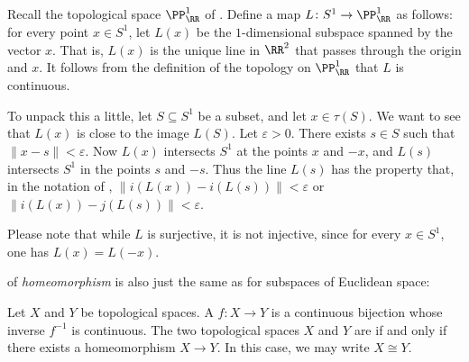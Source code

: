 \begin{exm}
	Recall the topological space $\PP^1_{\RR}$ of .
	Define a map $ L \colon S^1 \to \PP^1_{\RR}$ as follows: for every point $x \in S^1$, let $L(x)$ be the $1$-dimensional subspace spanned by the vector $x$.
	That is, $L(x)$ is the unique line in $\RR^2$ that passes through the origin and $x$.
	It follows from the definition of the topology on $\PP^1_{\RR}$ that $L$ is continuous.

	To unpack this a little, let $S \subseteq S^1$ be a subset, and let $x \in \tau(S)$.
	We want to see that $L(x)$ is close to the image $L(S)$.
	Let $\varepsilon>0$.
	There exists $ s \in S$ such that $\|x-s\| < \varepsilon$.
	Now $L(x)$ intersects $S^1$ at the points $x$ and $-x$, and $L(s)$ intersects $S^1$ in the points $s$ and $-s$.
	Thus the line $L(s)$ has the property that, in the notation of , $\|i(L(x))-i(L(s))\| < \varepsilon$ or $\|i(L(x))-j(L(s))\| < \varepsilon$.

	Please note that while $L$ is surjective, it is not injective, since for every $x \in S^1$, one has $L(x) = L(-x)$.
\end{exm}

 of \emph{homeomorphism} is also just the same as for subspaces of Euclidean space:

\begin{dfn}
	Let $X$ and $Y$ be topological spaces.
	A  $f \colon X \to Y $ is a continuous bijection whose inverse $f^{-1}$ is continuous.
	The two topological spaces $X$ and $Y$ are  if and only if there exists a homeomorphism $X \to Y$.
	In this case, we may write $X \cong Y$.
\end{dfn}

